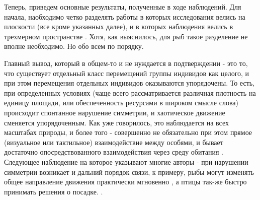 	Теперь, приведем основные результаты, полученные в ходе наблюдений. Для начала, наобходимо четко разделять работы в которых исследования велись на плоскости (все кроме указанных далее), и в которых наблюдения велись в трехмерном пространстве \cite{cullen1965,ballerini2008,major1978,makris2009}. Хотя, как выяснилось, для рыб такое разделение не вполне необходимо. Но обо всем по порядку.

	Главный вывод, который в общем-то и не нуждается в подтверждении - это то, что существует отдельный класс перемещений группы индивидов как целого, и при этом перемещения отдельных индивидов оказываются упорядочены. То есть, при определенных условиях (чаще всего рассматривается различная плотность на единицу площади, или обеспеченность ресурсами в широком смысле слова) происходит спонтанное нарушение симметрии, и хаотическое движение сменяется упорядоченным. Как уже говорилось, это наблюдается на всех масштабах природы, и более того - совершенно не обязательно при этом прямое (визуальное или тактильное) взаимодействие между особями, и бывает достаточно опосредствованного взаимодействия через среду обитания \cite[с. 119]{vicsek2012}. %
	Следующее наблюдение на которое указывают многие авторы - при нарушении симметрии возникает и дальний порядок связи, к примеру, рыбы могут изменять общее направление движения практически мгновенно \cite{cambui2012}, а птицы так-же быстро принимать решения о посадке. \cite{lukeman2010,major1978}.

